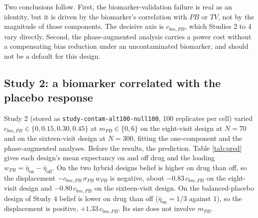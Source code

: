 \documentclass[
  11pt,
]{article}
\begin{document}
Two conclusions follow. First, the biomarker-validation failure is real
as an identity, but it is driven by the biomarker's correlation with \(PB\)
or \(TV\), not by the magnitude of those components. The decisive axis is
\(c_{bm,PB}\), which Studies 2 to 4 vary directly. Second, the
phase-augmented analysis carries a power cost without a compensating bias
reduction under an uncontaminated biomarker, and should not be a default
for this design.

\subsection{Study 2: a biomarker correlated with the placebo response}\label{study-2-a-biomarker-correlated-with-the-placebo-response}

Study 2 (stored as \texttt{study-contam-alt100-null100}, 100 replicates
per cell) varied \(c_{bm,PB} \in \{0, 0.15, 0.30, 0.45\}\) at \(m_{PB} \in
\{0, 6\}\) on the eight-visit design at \(N = 70\) and on the sixteen-visit
design at \(N = 300\), fitting the one-component and the phase-augmented
analyses. Before the results, the prediction. Table \ref{tab:pred} gives
each design's mean expectancy on and off drug and the loading
\(w_{PB} = \bar\eta_{\text{on}} - \bar\eta_{\text{off}}\). On the two hybrid
designs belief is higher on drug than off, so the displacement
\(-c_{bm,PB}\,\sigma_{PB}\,w_{PB}\) is negative, about \(-0.83\,c_{bm,PB}\)
on the eight-visit design and \(-0.80\,c_{bm,PB}\) on the sixteen-visit
design. On the balanced-placebo design of Study 4 belief is lower on drug
than off (\(\bar\eta_{\text{on}} = 1/3\) against \(1\)), so the displacement
is positive, \(+1.33\,c_{bm,PB}\). Its size does not involve \(m_{PB}\).

\begin{table}[H]
\centering
\caption{\label{tab:pred}Expectancy loading of each design and the predicted displacement of the one-component biomarker slope, $-c_{bm,PB}\,\sigma_{PB}\,w_{PB}$ with $\sigma_{PB} = 2$. Expectancies are averaged over on-drug and off-drug visits with the binary drug state, pooled over paths.}
\centering
{}
\end{table}
\end{document}
